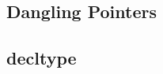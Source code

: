 \documentclass{report}
\begin{document}
    \bigbreak \noindent 
    \subsection{Dangling Pointers}

    \pagebreak 
    \bigbreak \noindent 

    \pagebreak 
    \bigbreak \noindent 

    \bigbreak \noindent 
    \subsection{decltype}










    



	

	




    
\end{document}
